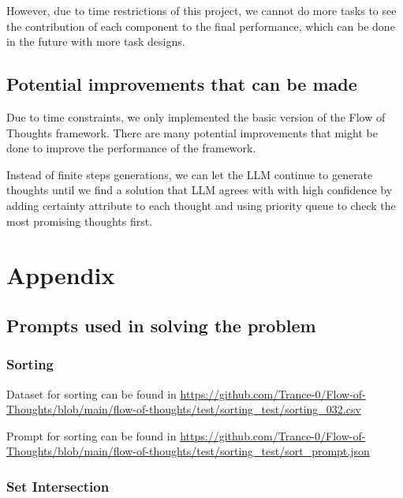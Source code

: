 \documentclass{article}
\begin{document}
However, due to time restrictions of this project, we cannot do more tasks to see the contribution of each component to the final performance, which can be done in the future with more task designs.

\subsection{Potential improvements that can be made}
\label{sec:future_work_self_generation}

Due to time constraints, we only implemented the basic version of the Flow of Thoughts framework. There are many potential improvements that might be done to improve the performance of the framework.

Instead of finite steps generations, we can let the LLM continue to generate thoughts until we find a solution that LLM agrees with with high confidence by adding certainty attribute \cite{lin2022teachingmodelsexpressuncertainty} to each thought and using priority queue to check the most promising thoughts first.

\medskip
{
\small
{}

}

\section{Appendix}

\subsection{Prompts used in solving the problem}

\subsubsection{Sorting}
\label{sec:appendix_sorting}

Dataset for sorting can be found in \url{https://github.com/Trance-0/Flow-of-Thoughts/blob/main/flow-of-thoughts/test/sorting_test/sorting_032.csv}

Prompt for sorting can be found in \url{https://github.com/Trance-0/Flow-of-Thoughts/blob/main/flow-of-thoughts/test/sorting_test/sort_prompt.json}

\subsubsection{Set Intersection}
\label{sec:appendix_set_intersection}
\end{document}

